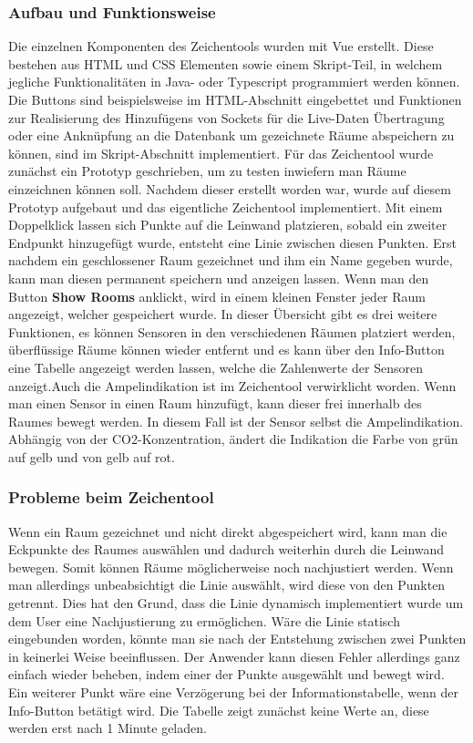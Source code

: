 \documentclass[]{article}
\begin{document}
				\subsubsection{Aufbau und Funktionsweise}
				Die einzelnen Komponenten des Zeichentools wurden mit Vue erstellt. Diese bestehen aus HTML und CSS Elementen sowie einem Skript-Teil, in welchem jegliche Funktionalitäten in Java- oder Typescript programmiert werden können. Die Buttons sind beispielsweise im HTML-Abschnitt eingebettet und Funktionen zur Realisierung des Hinzufügens von Sockets für die Live-Daten Übertragung oder eine Anknüpfung an die Datenbank um gezeichnete Räume abspeichern zu können, sind im Skript-Abschnitt implementiert. 
				Für das Zeichentool wurde zunächst ein Prototyp geschrieben, um zu testen inwiefern man Räume einzeichnen können soll. Nachdem dieser erstellt worden war, wurde auf diesem Prototyp aufgebaut und das eigentliche Zeichentool implementiert. Mit einem Doppelklick lassen sich Punkte auf die Leinwand platzieren, sobald ein zweiter Endpunkt hinzugefügt wurde, entsteht eine Linie zwischen diesen Punkten. Erst nachdem ein geschlossener Raum gezeichnet und ihm ein Name gegeben wurde, kann man diesen permanent speichern und anzeigen lassen. Wenn man den Button \textbf{Show Rooms} anklickt, wird in einem kleinen Fenster jeder Raum angezeigt, welcher gespeichert wurde. In dieser Übersicht gibt es drei weitere Funktionen, es können Sensoren in den verschiedenen Räumen platziert werden, überflüssige Räume können wieder entfernt und es kann über den Info-Button eine Tabelle angezeigt werden lassen, welche die Zahlenwerte der Sensoren anzeigt.\newline Auch die Ampelindikation ist im Zeichentool verwirklicht worden. Wenn man einen Sensor in einen Raum hinzufügt, kann dieser frei innerhalb des Raumes bewegt werden. In diesem Fall ist der Sensor selbst die Ampelindikation. Abhängig von der CO2-Konzentration, ändert die Indikation die Farbe von grün auf gelb und von gelb auf rot. 
				\subsubsection{Probleme beim Zeichentool}
		 		Wenn ein Raum gezeichnet und nicht direkt abgespeichert wird, kann man die Eckpunkte des Raumes auswählen und dadurch weiterhin durch die Leinwand bewegen. Somit können Räume möglicherweise noch nachjustiert werden. Wenn man allerdings unbeabsichtigt die Linie auswählt, wird diese von den Punkten getrennt. Dies hat den Grund, dass die Linie dynamisch implementiert wurde um dem User eine Nachjustierung zu ermöglichen. Wäre die Linie statisch eingebunden worden, könnte man sie nach der Entstehung zwischen zwei Punkten in keinerlei Weise beeinflussen. Der Anwender kann diesen Fehler allerdings ganz einfach wieder beheben, indem einer der Punkte ausgewählt und bewegt wird. \newline Ein weiterer Punkt wäre eine Verzögerung bei der Informationstabelle, wenn der Info-Button betätigt wird. Die Tabelle zeigt zunächst keine Werte an, diese werden erst nach 1 Minute geladen. 
			
\end{document}
